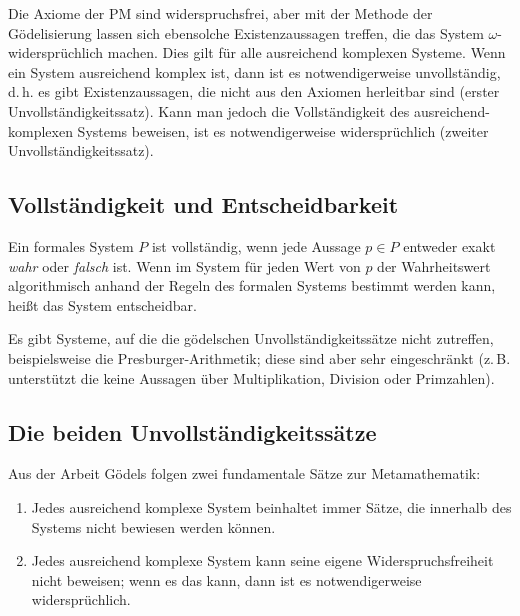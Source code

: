 Die Axiome der PM sind widerspruchsfrei, aber mit der Methode der Gödelisierung
lassen sich ebensolche Existenzaussagen treffen, die das System $\omega$-widersprüchlich
machen. Dies gilt für alle ausreichend komplexen
Systeme. Wenn ein System ausreichend komplex ist, dann ist es notwendigerweise unvollständig,
d.\,h. es gibt Existenzaussagen, die nicht aus den Axiomen herleitbar sind (erster
Unvollständigkeitssatz). Kann man jedoch die
Vollständigkeit des ausreichend-komplexen Systems beweisen, ist es notwendigerweise
widersprüchlich (zweiter Unvollständigkeitssatz).

\subsection*{Vollständigkeit und Entscheidbarkeit}

Ein formales System $P$ ist vollständig, wenn jede Aussage $p \in P$ entweder
exakt \textit{wahr} oder \textit{falsch} ist. Wenn im System für jeden Wert
von $p$ der  Wahrheitswert algorithmisch anhand der Regeln des
formalen Systems bestimmt werden kann, heißt das System \frq entscheidbar\flq.

Es gibt Systeme, auf die die gödelschen Unvollständigkeitssätze nicht zutreffen, beispielsweise die Presburger-Arithmetik;
diese sind aber sehr eingeschränkt
(z.\,B. unterstützt die  keine Aussagen über Multiplikation,
Division oder Primzahlen).

\subsection*{Die beiden Unvollständigkeitssätze}

Aus der Arbeit Gödels folgen zwei fundamentale Sätze zur Metamathematik:

\begin{enumerate}
	\item Jedes ausreichend komplexe System beinhaltet immer Sätze, die innerhalb
		des Systems nicht bewiesen werden können.
	\item Jedes ausreichend komplexe System kann seine eigene Widerspruchsfreiheit
		nicht beweisen; wenn es das kann, dann ist es
		notwendigerweise widersprüchlich.
\end{enumerate}


